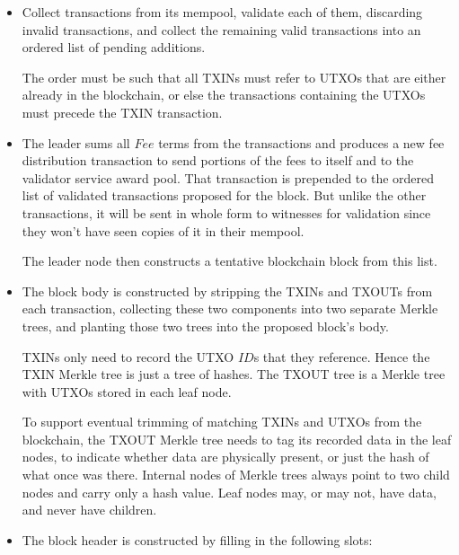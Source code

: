 \documentclass[8pt,fleqn,openany]{book}
\begin{document}
\begin{itemize}
  \item {Collect transactions from its mempool, validate each of them, discarding invalid transactions, and collect the remaining valid transactions into an ordered list of pending additions.

  The order must be such that all TXINs must refer to UTXOs that are either already in the blockchain, or else the transactions containing the UTXOs must precede the TXIN transaction.}
  \item {The leader sums all $Fee$ terms from the transactions and produces a new fee distribution transaction to send portions of the fees to itself and to the validator service award pool. That transaction is prepended to the ordered list of validated transactions proposed for the block. But unlike the other transactions, it will be sent in whole form to witnesses for validation since they won’t have seen copies of it in their mempool.

  The leader node then constructs a tentative blockchain block from this list.}
  \item {The block body is constructed by stripping the TXINs and TXOUTs from each transaction, collecting these two components into two separate Merkle trees, and planting those two trees into the proposed block’s body.

  TXINs only need to record the UTXO $ID$s that they reference. Hence the TXIN Merkle tree is just a tree of hashes. The TXOUT tree is a Merkle tree with UTXOs stored in each leaf node.

  To support eventual trimming of matching TXINs and UTXOs from the blockchain, the TXOUT Merkle tree needs to tag its recorded data in the leaf nodes, to indicate whether data are physically present, or just the hash of what once was there. Internal nodes of Merkle trees always point to two child nodes and carry only a hash value. Leaf nodes may, or may not, have data, and never have children.}
  \item {The block header is constructed by filling in the following slots:

}
\end{itemize}
\end{document}
